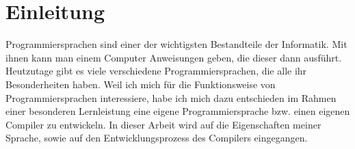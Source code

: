 \section{Einleitung}
    Programmiersprachen sind einer der wichtigsten Bestandteile der Informatik.
    Mit ihnen kann man einem Computer Anweisungen geben, die dieser dann ausführt.
    Heutzutage gibt es viele verschiedene Programmiersprachen, die alle ihr Besonderheiten haben.
    Weil ich mich für die Funktionsweise von Programmiersprachen interessiere, habe ich mich dazu
    entschieden im Rahmen einer besonderen Lernleistung eine eigene Programmiersprache bzw. einen
    eigenen Compiler zu entwickeln. In dieser Arbeit wird auf die Eigenschaften meiner Sprache, sowie
    auf den Entwicklungsprozess des Compilers eingegangen.
